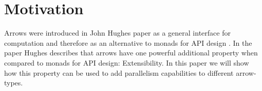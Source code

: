 \section{Motivation}
Arrows were introduced in John Hughes paper as a general interface for computation and therefore as an alternative to monads for API design \citHughes. In the paper Hughes describes that arrows have one powerful additional property when compared to monads for API design: Extensibility. In this paper we will show how this property can be used to add parallelism capabilities to different arrow-types.